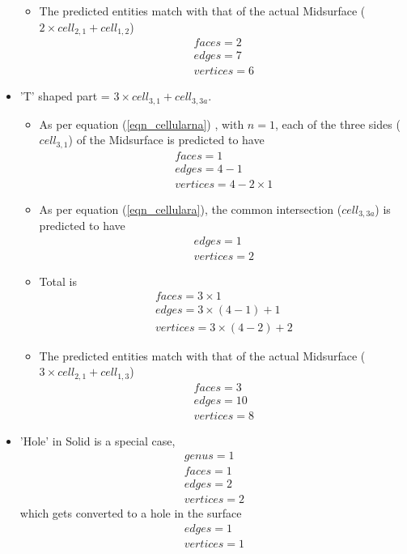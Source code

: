 \begin{itemize}
\begin{itemize}
	\item The predicted entities match with that of the actual Midsurface ($2\times cell_{2,1} +cell_{1,2}$) 
		\begin{align*}
		faces=2\\edges=7\\vertices=6
		\end{align*}
\end{itemize}


\item 'T' shaped part =  $3 \times cell_{3,1} + cell_{3,3a}$. 

\begin{itemize}
[noitemsep,topsep=2pt,parsep=2pt,partopsep=2pt,leftmargin=*]

\item As per equation (\ref{eqn_cellularna}) , with $n=1$, each of the three sides ($cell_{3,1}$) of the Midsurface is predicted to have  
	\begin{align*}
	faces=1\\edges=4-1\\vertices=4-2\times 1
	\end{align*}
\item As per equation (\ref{eqn_cellulara}), the common intersection ($cell_{3,3a}$) is predicted to have 
	\begin{align*}
	edges=1\\vertices=2
	\end{align*}

\item Total is 
	\begin{align*}
	faces=3\times1\\edges=3\times(4-1) + 1\\ vertices=3\times(4-2) + 2
	\end{align*}

	\item The predicted entities match with that of the actual Midsurface ($3\times cell_{2,1} +cell_{1,3}$) 
		\begin{align*}
		faces=3\\edges=10\\vertices=8
		\end{align*}
\end{itemize}

\item 'Hole' in Solid is a special case, 
		\begin{align*}
		genus=1\\faces=1\\edges=2\\vertices=2
		\end{align*}
		which gets converted to a hole in the surface
			\begin{align*}
	edges=1\\vertices=1
	\end{align*}

\end{itemize}

